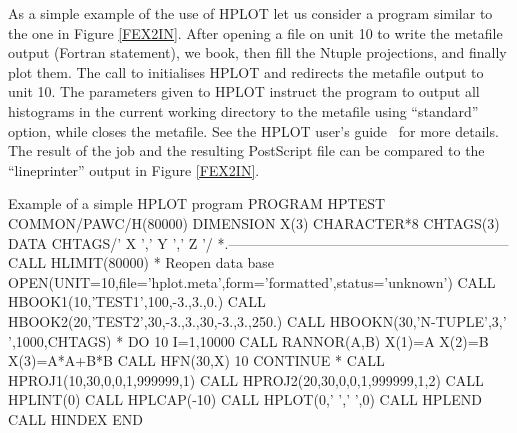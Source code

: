 As a simple example of the use of HPLOT let us consider a program
similar to the one in Figure \ref{FEX2IN}. After opening a file
on unit 10 to write the metafile output (Fortran  statement),
we book, then fill the Ntuple projections, and finally plot them.
The call to  initialises HPLOT and 
redirects the metafile output to unit 10. The parameters
given to HPLOT instruct the program to output all
histograms in the current working directory to the metafile
using ``standard'' option, while  closes the
metafile. 
See the HPLOT user's guide~\cite{bib-HIGZHPLOT} for more details.
The result of the job and the resulting PostScript file 
can be compared to the ``lineprinter'' output in Figure \ref{FEX2IN}.

\begin{XMPt}{Example of a simple HPLOT program}
      PROGRAM HPTEST
      COMMON/PAWC/H(80000)
      DIMENSION X(3)
      CHARACTER*8 CHTAGS(3)
      DATA CHTAGS/'   X   ','   Y   ','   Z   '/
*.------------------------------------------------------------
      CALL HLIMIT(80000)
*             Reopen data base
      OPEN(UNIT=10,file='hplot.meta',form='formatted',status='unknown')
      CALL HBOOK1(10,'TEST1',100,-3.,3.,0.)
      CALL HBOOK2(20,'TEST2',30,-3.,3.,30,-3.,3.,250.)
      CALL HBOOKN(30,'N-TUPLE',3,' ',1000,CHTAGS)
*
      DO 10 I=1,10000
         CALL RANNOR(A,B)
         X(1)=A
         X(2)=B
         X(3)=A*A+B*B
         CALL HFN(30,X)
  10  CONTINUE
*
      CALL HPROJ1(10,30,0,0,1,999999,1)
      CALL HPROJ2(20,30,0,0,1,999999,1,2)
      CALL HPLINT(0)
      CALL HPLCAP(-10)
      CALL HPLOT(0,' ',' ',0)
      CALL HPLEND
      CALL HINDEX
      END
\end{XMPt}
\newpage
